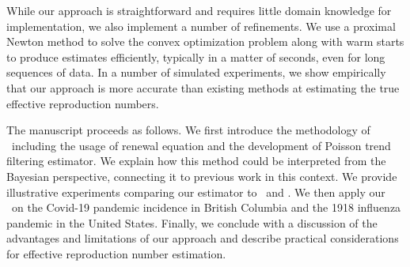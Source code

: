 While our approach is straightforward and requires little domain knowledge for
implementation, we also implement a number of refinements. 
% 
We use a proximal Newton method to solve the convex optimization problem along
with warm starts to produce estimates efficiently,
typically in a matter of seconds, even for long sequences of data.
In a number of simulated experiments, we show empirically that our approach is
more accurate than existing methods at estimating the true effective reproduction numbers. 


The manuscript proceeds as follows. We first introduce the methodology of
\RtEstim\ including the usage of renewal equation and the development of Poisson
trend filtering estimator. We explain how this method could be interpreted from
the Bayesian perspective, connecting it to previous work in this context. We
provide illustrative experiments comparing our estimator to \EpiEstim\ and
\EpiLPS. We then apply our \RtEstim\ on the Covid-19 pandemic incidence in
British Columbia and the 1918 influenza pandemic in the United States. Finally,
we conclude with a discussion of the advantages and limitations of our approach
and describe practical considerations for effective reproduction number
estimation.
